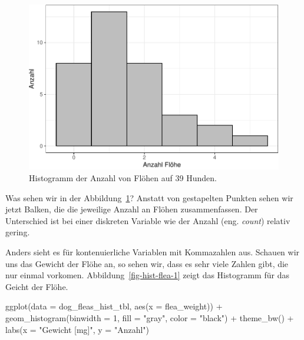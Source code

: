 \documentclass[
  letterpaper,
  DIV=11,
  oneside]{scrreport}
\newenvironment{Shaded}{\begin{snugshade}}{\end{snugshade}}
\newcommand{\AttributeTok}[1]{\textcolor[rgb]{0.40,0.45,0.13}{#1}}
\newcommand{\DecValTok}[1]{\textcolor[rgb]{0.68,0.00,0.00}{#1}}
\newcommand{\FunctionTok}[1]{\textcolor[rgb]{0.28,0.35,0.67}{#1}}
\newcommand{\NormalTok}[1]{\textcolor[rgb]{0.00,0.23,0.31}{#1}}
\newcommand{\SpecialCharTok}[1]{\textcolor[rgb]{0.37,0.37,0.37}{#1}}
\newcommand{\StringTok}[1]{\textcolor[rgb]{0.13,0.47,0.30}{#1}}
\begin{document}
\begin{figure}[H]

{\centering \includegraphics{./eda-ggplot_files/figure-pdf/fig-hist-flea-count-1.pdf}

}

\caption{\label{fig-hist-flea-count}Histogramm der Anzahl von Flöhen auf
39 Hunden.}

\end{figure}

Was sehen wir in der Abbildung~\ref{fig-hist-flea-count}? Anstatt von
gestapelten Punkten sehen wir jetzt Balken, die die jeweilige Anzahl an
Flöhen zusammenfassen. Der Unterschied ist bei einer diskreten Variable
wie der Anzahl (eng. \emph{count}) relativ gering.

Anders sieht es für kontenuierliche Variablen mit Kommazahlen aus.
Schauen wir uns das Gewicht der Flöhe an, so sehen wir, dass es sehr
viele Zahlen gibt, die nur einmal vorkomen.
Abbildung~\ref{fig-hist-flea-1} zeigt das Histogramm für das Geicht der
Flöhe.

\begin{Shaded}
\begin{Highlighting}[]
\FunctionTok{ggplot}\NormalTok{(}\AttributeTok{data =}\NormalTok{ dog\_fleas\_hist\_tbl, }\FunctionTok{aes}\NormalTok{(}\AttributeTok{x =}\NormalTok{ flea\_weight)) }\SpecialCharTok{+}
  \FunctionTok{geom\_histogram}\NormalTok{(}\AttributeTok{binwidth =} \DecValTok{1}\NormalTok{, }\AttributeTok{fill =} \StringTok{"gray"}\NormalTok{, }\AttributeTok{color =} \StringTok{"black"}\NormalTok{) }\SpecialCharTok{+}
  \FunctionTok{theme\_bw}\NormalTok{() }\SpecialCharTok{+}
  \FunctionTok{labs}\NormalTok{(}\AttributeTok{x =} \StringTok{"Gewicht [mg]"}\NormalTok{, }\AttributeTok{y =} \StringTok{"Anzahl"}\NormalTok{) }
\end{Highlighting}
\end{Shaded}
\end{document}
